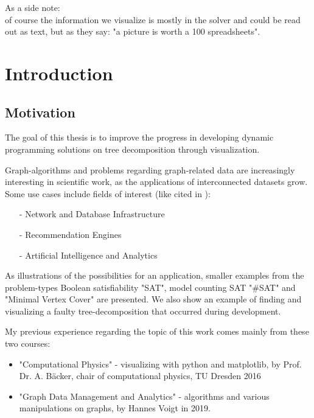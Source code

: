 \documentclass[a4paper, 12pt, bibliography=totoc]{scrartcl}
\begin{document}
As a side note: \\
of course the information we visualize is mostly in the solver and could be read out as text, but as they say: "a picture is worth a 100 spreadsheets".


\newpage
\tableofcontents

\newpage


\section{Introduction}
\subsection{Motivation}

The goal of this thesis is to improve the progress in developing dynamic programming solutions on tree decomposition through visualization.

Graph-algorithms and problems regarding graph-related data are increasingly interesting in scientific work, as the applications of interconnected datasets grow.
Some use cases include fields of interest (like cited in \cite{graphUseCases}): %
\begin{itemize}
	\item[-] Network and Database Infrastructure
	\item[-] Recommendation Engines
	\item[-] Artificial Intelligence and Analytics
\end{itemize}

As illustrations of the possibilities for an application, smaller examples from the problem-types Boolean satisfiability "SAT", model counting SAT "\#SAT" and "Minimal Vertex Cover" are presented.
We also show an example of finding  and visualizing a faulty tree-decomposition that occurred during development.

My previous experience regarding the topic of this work comes mainly from these two courses:
\begin{itemize}
	\item "Computational Physics" - visualizing with python and matplotlib, by Prof. Dr. A. Bäcker,
	chair of computational physics, TU Dresden 2016
	\item "Graph Data Management and Analytics" - algorithms and various manipulations on graphs, by Hannes Voigt in 2019. \cite{VLGDMA}
\end{itemize}
\end{document}
